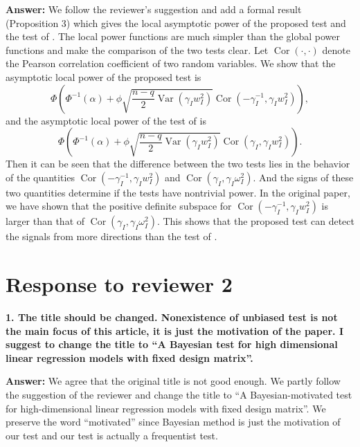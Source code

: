 \documentclass[11pt]{article}
\DeclareMathOperator{\myVar}{Var}
\DeclareMathOperator{\myCor}{Cor}
\theoremstyle{plain}
\theoremstyle{definition}
\theoremstyle{remark}
\begin{document}
\textbf{Answer:}
We follow the reviewer's suggestion and add a formal result (Proposition 3) which gives the local asymptotic power of the proposed test and the test of \cite{Goeman2006}.
The local power functions are much simpler than the global power functions and make the comparison of the two tests clear.
Let $\myCor(\cdot, \cdot)$ denote the Pearson correlation coefficient of two random variables.
We show that the asymptotic local power of the proposed test is
\begin{equation*}
\Phi\left(
    \Phi^{-1}(\alpha) + \phi \sqrt{\frac{n-q}{2}\myVar(\gamma_I w_I^2 )} {\myCor(-\gamma_I^{-1}, \gamma_I w_I^2)}
\right) 
,
\end{equation*}
and the asymptotic local power of the test of \cite{Goeman2006} is
\begin{equation*}
\Phi\left(
    \Phi^{-1}(\alpha) + \phi \sqrt{\frac{n-q}{2}\myVar(\gamma_I w_I^2 )} {\myCor(\gamma_I, \gamma_I w_I^2)}
\right)
.
\end{equation*}
Then it can be seen that the difference between the two tests lies in the behavior of the quantities $\myCor(-\gamma_I^{-1}, \gamma_I w_I^2)$ and $\myCor(\gamma_I, \gamma_I \omega_I^2)$.
And the signs of these two quantities determine if the tests have nontrivial power.
In the original paper, we have shown that the positive definite subspace for $\myCor(-\gamma_I^{-1}, \gamma_I w_I^2)$ is larger than that of $\myCor(\gamma_I, \gamma_I \omega_I^2)$.
This shows that the proposed test can detect the signals from more directions than the test of \cite{Goeman2006}.




\section{Response to reviewer 2}

\textbf{
    1. The title should be changed. Nonexistence of unbiased test is not the main focus of this article, it is just the motivation of the paper. I suggest to change the title to ``A Bayesian test for high dimensional linear regression models with fixed design matrix''.
}

\textbf{Answer:}
We agree that the original title is not good enough.
We partly follow the suggestion of the reviewer and change the title to ``A Bayesian-motivated test for high-dimensional linear regression models with fixed design matrix''.
We preserve the word ``motivated'' since Bayesian method is just the motivation of our test and our test is actually a frequentist test.
\end{document}
